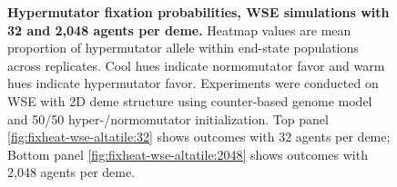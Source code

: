 \begin{figure}[h]
  \begin{minipage}{\linewidth}
    \caption{%
\textbf{Hypermutator fixation probabilities, WSE simulations with 32 and 2,048 agents per deme.}
\footnotesize
Heatmap values are mean proportion of hypermutator allele within end-state populations across replicates.
Cool hues indicate normomutator favor and warm hues indicate hypermutator favor.
Experiments were conducted on WSE with 2D deme structure using counter-based genome model and 50/50 hyper-/normomutator initialization.
Top panel \ref{fig:fixheat-wse-altatile:32} shows outcomes with 32 agents per deme;
Bottom panel \ref{fig:fixheat-wse-altatile:2048} shows outcomes with 2,048 agents per deme.
    }
    \label{fig:fixheat-wse-altatile}
  \end{minipage}
\end{figure}
